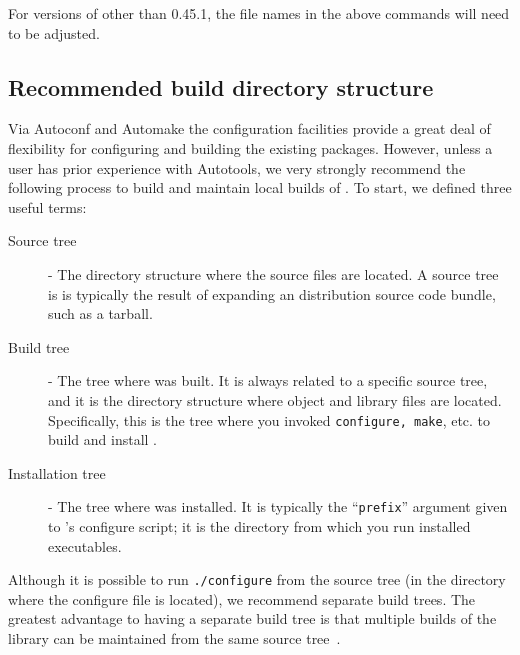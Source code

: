 For versions of \Queso{} other than 0.45.1, the file names in the above commands will need to be adjusted.


\subsection{Recommended build directory structure}\label{sec:Queso_tree}

Via Autoconf and Automake the \Queso{} configuration facilities provide a great deal 
of flexibility for configuring and building the existing \Queso{} packages. However,
unless a user has prior experience with Autotools, we very strongly recommend
the following process to build and maintain local builds of \Queso{}.
To start, we defined three useful terms:

\begin{description}
 \item [Source tree] - The directory structure where the \Queso{} source files are located. A source
tree is is typically the result of expanding an \Queso{} distribution source code bundle, such as a tarball.%
 \item [Build tree] %
- The tree where \Queso{} was built. It is always related to a specific source tree, and it is the directory structure where object and library files are located. Specifically, this is the tree where you invoked \texttt{configure, make}, etc. to build and install \Queso{}.
 \item [Installation tree] - The tree where \Queso{} was installed. It is typically the ``\texttt{prefix}'' argument given to \Queso{}'s configure script; it is the directory from which you run installed \Queso{} executables.
\end{description}

Although it is possible to run \verb+./configure+ from the source tree (in the directory where the configure file is located), we recommend separate build trees. The greatest advantage to having a separate build tree is that multiple builds of the library
can be maintained from the same source tree~\cite{Trilinos}.


